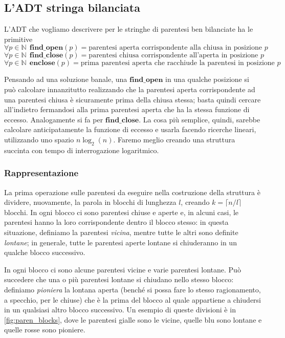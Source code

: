 \subsection{L'ADT stringa bilanciata}
L'ADT che vogliamo descrivere per le stringhe di parentesi ben bilanciate ha le primitive
$$
	\forall p \in \mathbb{N} ~~ \mathbf{find\_open}(p) = \text{parentesi aperta corrispondente alla chiusa in posizione } p
$$
$$
	\forall p \in \mathbb{N} ~~ \mathbf{find\_close}(p) = \text{parentesi chiusa corrispondente all'aperta in posizione } p
$$
$$
	\forall p \in \mathbb{N} ~~ \mathbf{enclose}(p) = \text{prima parentesi aperta che racchiude la parentesi in posizione } p
$$

Pensando ad una soluzione banale, una $\mathbf{find\_open}$ in una qualche posizione si può
calcolare innanzitutto realizzando che la parentesi aperta corrispondente ad una
parentesi chiusa è sicuramente prima della chiusa stessa; basta quindi cercare all'indietro fermandosi
alla prima parentesi aperta che ha la stessa funzione di eccesso. Analogamente si fa per $\mathbf{find\_close}$.
La cosa più semplice, quindi, sarebbe calcolare anticipatamente la funzione di eccesso e usarla
facendo ricerche lineari, utilizzando uno spazio $n \log_2(n)$.
Faremo meglio creando una struttura succinta con tempo di interrogazione logaritmico.

\subsubsection{Rappresentazione}
La prima operazione sulle parentesi da eseguire nella costruzione della struttura è dividere, nuovamente,
la parola in blocchi di lunghezza $l$, creando $k = \lceil n/l \rceil$ blocchi. In ogni blocco
ci sono parentesi chiuse e aperte e, in alcuni casi, le parentesi hanno la loro corrispondente
dentro il blocco stesso: in questa situazione, definiamo la parentesi \textit{vicina}, mentre
tutte le altri sono definite \textit{lontane}; in generale, tutte le parentesi aperte lontane
si chiuderanno in un qualche blocco successivo.

In ogni blocco ci sono alcune parentesi vicine e varie parentesi lontane. Può succedere
che una o più parentesi lontane si chiudano nello stesso blocco: definiamo \textit{pioniera}
la lontana aperta (benché si possa fare lo stesso ragionamento, a specchio, per le chiuse)
che è la prima del blocco al quale appartiene a chiudersi in un qualsiasi altro blocco successivo.
Un esempio di queste divisioni è in \cref{fig:paren_blocks}, dove le parentesi gialle sono le vicine,
quelle blu sono lontane e quelle rosse sono pioniere.

